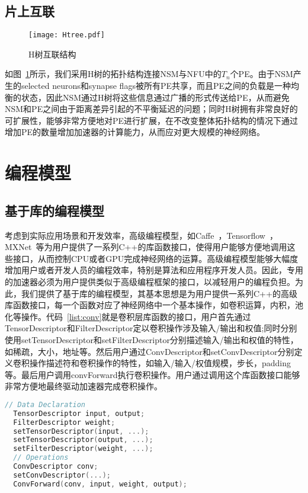 \subsection{片上互联}

\begin{figure}[h]
\centering
\texttt{[image: Htree.pdf]}
\caption{H树互联结构}
\label{fig:Htree}
\end{figure}

如图~\ref{fig:Htree}所示，我们采用H树的拓扑结构连接NSM与NFU中的$T_n$个PE。由于NSM产生的selected neurons和synapse flags被所有PE共享，而且PE之间的负载是一种均衡的状态，因此NSM通过H树将这些信息通过广播的形式传送给PE，从而避免NSM和PE之间由于距离差异引起的不平衡延迟的问题；同时H树拥有非常良好的可扩展性，能够非常方便地对PE进行扩展，在不改变整体拓扑结构的情况下通过增加PE的数量增加加速器的计算能力，从而应对更大规模的神经网络。

\section{编程模型}

\subsection{基于库的编程模型}
考虑到实际应用场景和开发效率，高级编程模型，如Caffe~\cite{jia2014caffe}，Tensorflow~\cite{abadi2016tensorflow}， MXNet~\cite{chen2015mxnet}等为用户提供了一系列C++的库函数接口，使得用户能够方便地调用这些接口，从而控制CPU或者GPU完成神经网络的运算。高级编程模型能够大幅度增加用户或者开发人员的编程效率，特别是算法和应用程序开发人员。因此，专用的加速器必须为用户提供类似于高级编程框架的接口，以减轻用户的编程负担。为此，我们提供了基于库的编程模型，其基本思想是为用户提供一系列C++的高级库函数接口，每一个函数对应了神经网络中一个基本操作，如卷积运算，内积，池化等操作。代码~\ref{list:conv}就是卷积层库函数的接口，用户首先通过TensorDescriptor和FilterDescriptor定以卷积操作涉及输入/输出和权值;同时分别使用setTensorDescriptor和setFilterDescriptor分别描述输入/输出和权值的特性，如稀疏，大小，地址等。然后用户通过ConvDescriptor和setConvDescriptor分别定义卷积操作描述符和卷积操作的特性，如输入/输入/权值规模，步长，padding等。最后用户调用convForward执行卷积操作。用户通过调用这个库函数接口能够非常方便地最终驱动加速器完成卷积操作。

\begin{lstlisting}[language=C, frame=single, basicstyle=\footnotesize, caption=卷积层库函数接口, label=list:conv, captionpos=b]
  // Data Declaration
  TensorDescriptor input, output;
  FilterDescriptor weight;
  setTensorDescriptor(input, ...);
  setTensorDescriptor(output, ...);
  setFilterDescriptor(weight, ...);
  // Operations
  ConvDescriptor conv;
  setConvDescriptor(...);
  ConvForward(conv, input, weight, output);
\end{lstlisting}

